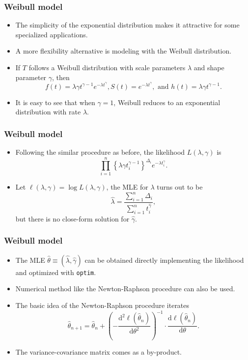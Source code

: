 \documentclass[10pt]{beamer}\usepackage[]{graphicx}\usepackage[]{color}
\newcommand{\dif}{\mathrm{d}}
\newcommand{\code}[1]{{\texttt{#1}}}
\begin{document}
\begin{frame}
  \frametitle{Weibull model}
  \begin{itemize}
  \item The simplicity of the exponential distribution makes it attractive for some specialized applications. 
  \item A more flexibility alternative is modeling with the Weibull distribution.
  \item If $T$ follows a Weibull distribution with scale parameters $\lambda$ and shape parameter $\gamma$, 
    then
    $$ f(t) = \lambda\gamma t^{\gamma-1}e^{-\lambda t^\gamma}, S(t) = e^{-\lambda t^\gamma}, \mbox{ and } h(t) = \lambda \gamma t ^{\gamma - 1}.$$
  \item It is easy to see that when $\gamma = 1$, Weibull reduces to an exponential distribution with rate $\lambda$.
  \end{itemize}  
\end{frame}


\begin{frame}
  \frametitle{Weibull model}
  \begin{itemize}
  \item Following the similar procedure as before, the likelihood $L(\lambda, \gamma)$ is
    $$\prod_{i = 1}^n\left\{\lambda\gamma t_i^{\gamma - 1}\right\}^{\Delta_i} e^{-\lambda t_i^\gamma}.$$
  \item Let $\ell(\lambda, \gamma) = \log L(\lambda, \gamma)$, the MLE for $\lambda$ turns out to be
    $$\hat\lambda = \frac{\sum_{i = 1}^n\Delta_i}{\sum_{i = 1}^nt_i^{\hat\gamma}},$$
    but there is no close-form solution for $\hat\gamma$.
  \end{itemize}  
\end{frame}
    
\begin{frame}
  \frametitle{Weibull model}
  \begin{itemize}    
  \item The MLE $\hat\theta\equiv (\hat\lambda, \hat\gamma)$ can be obtained
    directly implementing the likelihood and optimized with \code{optim}.
  \item Numerical method like the Newton-Raphson procedure can also be used.
  \item The basic idea of the Newton-Raphson procedure iterates 
    $$\hat\theta_{n + 1} = \hat\theta_n +
    \left(-\frac{\dif^2\ell(\hat\theta_n)}{\dif\theta^2}\right)^{-1} \cdot
    \frac{\dif\ell(\hat\theta_n)}{\dif\theta}.$$
  \item The variance-covariance matrix comes as a by-product.
  \end{itemize}  
\end{frame}
\end{document}
